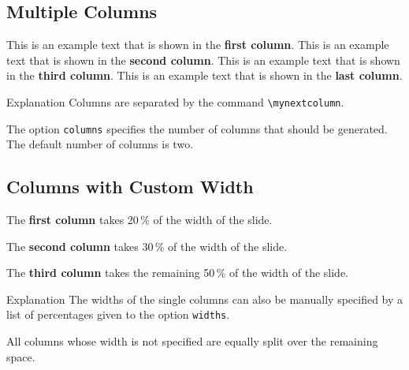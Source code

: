 \documentclass[
	aspectratio=169, %
	8pt, %
]{beamer}
\begin{document}
\subsection{Multiple Columns}
\begin{frame}{\insertsubsection}
	\begin{mycolumns}[columns=4] %
		This is an example text that is shown in the \textbf{first column}.
	\mynextcolumn
		This is an example text that is shown in the \textbf{second column}.
	\mynextcolumn
		This is an example text that is shown in the \textbf{third column}.
	\mynextcolumn
		This is an example text that is shown in the \textbf{last column}.
	\end{mycolumns}
	\vfill
	\begin{note}{Explanation}
		Columns are separated by the command \texttt{\textbackslash mynextcolumn}.

		The option \texttt{columns} specifies the number of columns that should be generated. The default number of columns is two.
	\end{note}
\end{frame}

\subsection{Columns with Custom Width}
\begin{frame}{\insertsubsection}
	\begin{mycolumns}[columns=3,widths={20,30}]
		\begin{example}{}
			The \textbf{first column} takes 20\,\% of the width of the slide.
		\end{example}
	\mynextcolumn
		\begin{example}{}
			The \textbf{second column} takes 30\,\% of the width of the slide.
		\end{example}
	\mynextcolumn
		\begin{example}{}
			The \textbf{third column} takes the remaining 50\,\% of the width of the slide.
		\end{example}
	\end{mycolumns}
	\vfill
	\begin{note}{Explanation}
		The widths of the single columns can also be manually specified by a list of percentages given to the option \texttt{widths}.

		All columns whose width is not specified are equally split over the remaining space.
	\end{note}
\end{frame}
\end{document}
